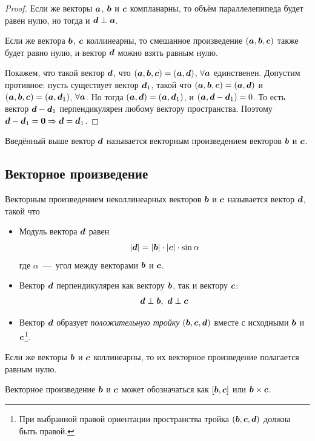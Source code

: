\documentclass[a4paper,12pt]{article}
\begin{document}
\begin{proof}
    Если же векторы $\boldsymbol a$, $\boldsymbol b$ и $\boldsymbol c$ компланарны, то объём параллелепипеда будет равен нулю, но тогда и $\bds d \hm\perp \bds a$.
    
    Если же вектора $\boldsymbol b$, $\boldsymbol c$ коллинеарны, то смешанное произведение $(\boldsymbol a, \boldsymbol b, \boldsymbol c)$ также будет равно нулю, и вектор $\boldsymbol d$ можно взять равным нулю.
    
    Покажем, что такой вектор $\boldsymbol d$, что $(\bds a, \bds b, \bds c) \hm= (\bds a, \bds d)$, $\forall \boldsymbol a$ единственен.
    Допустим противное: пусть существует вектор $\boldsymbol d_1$, такой что $(\bds a, \bds b, \bds c) \hm= (\bds a, \bds d)$ и $(\bds a, \bds b, \bds c) \hm= (\bds a, \bds d_1)$, $\forall \boldsymbol a$.
    Но тогда $(\bds a, \bds d) \hm= (\bds a, \bds d_1)$, и $(\bds a, \bds d \hm- \bds d_1) \hm= 0$.
    То есть вектор $\bds d \hm- \bds d_1$ перпендикулярен любому вектору пространства.
    Поэтому $\bds d \hm- \bds d_1 \hm= \bds 0 \hm\Rightarrow \bds d \hm= \bds d_1$.
  \end{proof}
  
  Введённый выше вектор $\boldsymbol d$ называется векторным произведением векторов $\boldsymbol b$ и $\boldsymbol c$.
  
  \subsection{Векторное произведение}
  
  \begin{definition}
    Векторным произведением неколлинеарных векторов $\boldsymbol b$ и $\boldsymbol c$ называется вектор $\boldsymbol d$, такой что
    \begin{itemize}
      \item Модуль вектора $\boldsymbol d$ равен
      \[
        |\boldsymbol d| = |\boldsymbol b| \cdot |\boldsymbol c| \cdot \sin\alpha
      \]
      где $\alpha$~---~угол между векторами $\boldsymbol b$ и $\boldsymbol c$.
      
      \item Вектор $\boldsymbol d$ перпендикулярен как вектору $\boldsymbol b$, так и вектору $\boldsymbol c$:
      \[
        \boldsymbol d \perp \boldsymbol b,\ \boldsymbol d \perp \boldsymbol c
      \]
      
      \item Вектор $\boldsymbol d$ образует \emph{положительную тройку} $(\boldsymbol b, \boldsymbol c, \boldsymbol d)$ вместе с исходными $\boldsymbol b$ и $\boldsymbol c$\footnote{При выбранной правой ориентации пространства тройка $(\boldsymbol b, \boldsymbol c, \boldsymbol d)$ должна быть правой.}.
    \end{itemize}
    
    Если же векторы $\boldsymbol b$ и $\boldsymbol c$ коллинеарны, то их векторное произведение полагается равным нулю.
    
    Векторное произведение $\boldsymbol b$ и $\boldsymbol c$ может обозначаться как $[\boldsymbol b, \boldsymbol c]$ или $\bds b \hm\times \bds c$.
  \end{definition}
  
\end{document}
